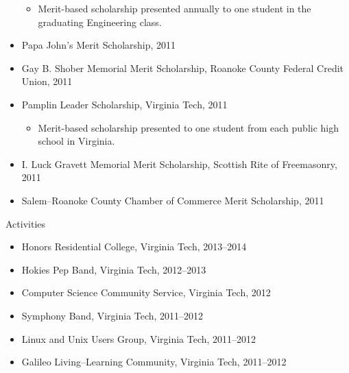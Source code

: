 \documentclass[letter]{article}
\begin{document}
\begin{minipage}{\textwidth}
\begin{itemize}
  \begin{itemize}
  \item Merit-based scholarship presented annually to one student in the graduating Engineering class.
  \end{itemize}
  \item Papa John's Merit Scholarship, 2011
  \item Gay B. Shober Memorial Merit Scholarship, Roanoke County Federal Credit Union, 2011
  \item Pamplin Leader Scholarship, Virginia Tech, 2011
  \begin{itemize}
  \item Merit-based scholarship presented to one student from each public high school in Virginia.
  \end{itemize}
  \item I. Luck Gravett Memorial Merit Scholarship, Scottish Rite of Freemasonry, 2011
  \item Salem--Roanoke County Chamber of Commerce Merit Scholarship, 2011
\end{itemize}
\bigskip

\end{minipage}\medskip

\begin{minipage}{\textwidth}
{\huge Activities }
\begin{itemize}
  \item Honors Residential College, Virginia Tech, 2013--2014
  \item Hokies Pep Band, Virginia Tech, 2012--2013
  \item Computer Science Community Service, Virginia Tech, 2012
  \item Symphony Band, Virginia Tech, 2011--2012
  \item Linux and Unix Users Group, Virginia Tech, 2011--2012
  \item Galileo Living--Learning Community, Virginia Tech, 2011--2012
\end{itemize}
\bigskip
\end{minipage}
\end{document}
